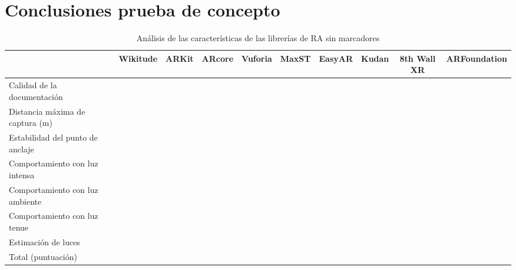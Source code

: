 \section{Conclusiones prueba de concepto}
\begin{table}[H]
\resizebox{\textwidth}{!} {
    \centering
    \begin{tabular}{|m{3cm}|c|c|c|c|c|c|c|c|c|}
    \hline
    &Wikitude&	ARKit &	ARcore & Vuforia &	MaxST &	EasyAR & Kudan & 8th Wall XR & ARFoundation\\
     \hline
         Calidad de la documentación      &          &       &        &         &       &        &       &             &              \\
 \hline
 Distancia máxima de captura (m)  &          &       &        &         &       &        &       &             &              \\
  \hline
Estabilidad del punto de anclaje &          &       &        &         &       &        &       &             &              \\
 \hline
Comportamiento con luz intensa   &          &       &        &         &       &        &       &             &              \\
 \hline
Comportamiento con luz ambiente  &          &       &        &         &       &        &       &             &              \\
 \hline
Comportamiento con luz tenue     &          &       &        &         &       &        &       &             &              \\
 \hline
Estimación de luces              &          &       &        &         &       &        &       &             &              \\
 \hline
Total (puntuación)               &          &       &        &         &       &        &       &             &            \\
\hline
    \end{tabular}
}
    \caption{Análisis de las características de las librerías de RA sin marcadores}
    \label{tab:my_label}
\end{table}

\noindent